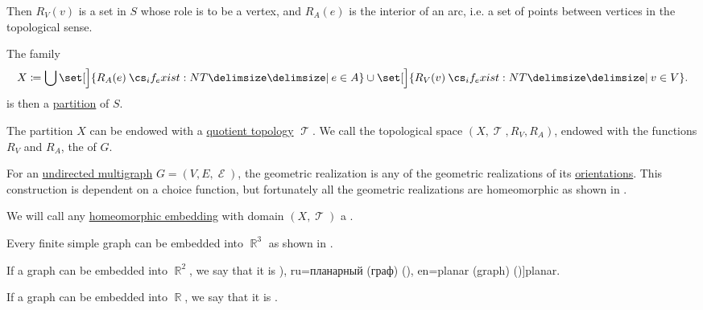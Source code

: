 \begin{definition}
  Then \( R_V(v) \) is a set in \( S \) whose role is to be a vertex, and \( R_A(e) \) is the interior of an arc, i.e. a set of points between vertices in the topological sense.

  The family
  \begin{equation*}
    X \coloneqq \bigcup \set[\Big]{ R_A(e) \given* e \in A } \cup \set[\Big]{ R_V(v) \given* v \in V }.
  \end{equation*}
  is then a \hyperref[def:set_partition]{partition} of \( S \).

  The partition \( X \) can be endowed with a \hyperref[def:topological_quotient]{quotient topology} \( \mscrT \). We call the topological space \( (X, \mscrT, R_V, R_A) \), endowed with the functions \( R_V \) and \( R_A \), the  of \( G \).

  \begin{thmenum}
     For an \hyperref[def:undirected_multigraph]{undirected multigraph} \( G = (V, E, \mscrE) \), the geometric realization is any of the geometric realizations of its \hyperref[def:multigraph_orientation]{orientations}. This construction is dependent on a choice function, but fortunately all the geometric realizations are homeomorphic as shown in .

     We will call any \hyperref[def:homeomorphism]{homeomorphic embedding} with domain \( (X, \mscrT) \) a .

    Every finite simple graph can be embedded into \( \BbbR^3 \) as shown in .

     If a graph can be embedded into \( \BbbR^2 \), we say that it is \term[bg=планарен (граф) (\cite[129]{Мирчев}), ru=планарный (граф) (\cite[313]{Зыков2004}), en=planar (graph) (\cite[93]{Diestel2005})]{planar}.

     If a graph can be embedded into \( \BbbR \), we say that it is .
  \end{thmenum}
\end{definition}

